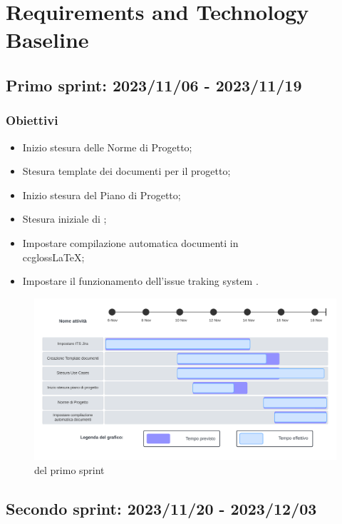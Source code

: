 \section{Requirements and Technology Baseline}
\label{pianificazione:\ccgloss{rtb}}

\subsection{Primo sprint: 2023/11/06 - 2023/11/19}
\subsubsection{Obiettivi}
\begin{itemize} 
    \item Inizio stesura delle Norme di Progetto;
    \item Stesura template dei documenti per il progetto;
    \item Inizio stesura del Piano di Progetto;
    \item Stesura iniziale di ;
    \item Impostare compilazione automatica documenti in \\ccgloss{LaTeX};
    \item Impostare il funzionamento dell'issue traking system .
\end{itemize}

\begin{figure}[h!]
    \centering  
    \includegraphics[width=\textwidth]{Roadmap1sprint.png}
    \caption{ del primo sprint}
    \label{fig:roadmap1s}
\end{figure}
\newpage

\subsection{Secondo sprint: 2023/11/20 - 2023/12/03}
